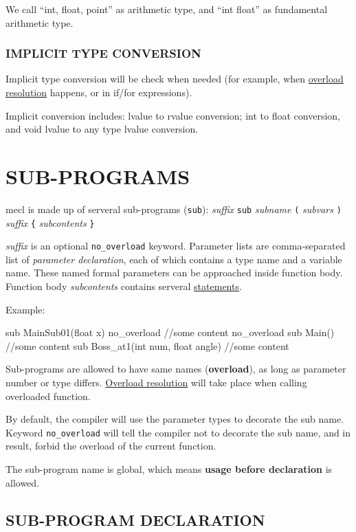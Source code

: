 \documentclass{article}
\begin{document}
We call ``int, float, point'' as arithmetic type, and ``int float'' as fundamental arithmetic type.

\subsubsection{IMPLICIT TYPE CONVERSION}

Implicit type conversion will be check when needed (for example, when \hyperref[chongzai]{overload resolution} happens, or in if/for expressions).

Implicit conversion includes: lvalue to rvalue conversion; int to float conversion, and void lvalue to any type lvalue conversion.

\section{SUB-PROGRAMS}

mecl is made up of serveral sub-programs (\verb|sub|): \textit{suffix} \verb|sub| \textit{subname} \verb|(| \textit{subvars} \verb|)| \textit{suffix} \verb|{| \textit{subcontents} \verb|}|

\textit{suffix} is an optional \verb|no_overload| keyword. Parameter lists are comma-separated list of \textit{parameter declaration}, each of which contains a type name and a variable name. These named formal parameters can be approached inside function body. Function body \textit{subcontents} contains serveral \hyperref[yuju]{statements}.

Example:

\begin{MUAvbt}
sub MainSub01(float x) no_overload
{
	//some content
}
no_overload sub Main()
{
	//some content
}
sub Boss_at1(int num, float angle) {
	//some content
}
\end{MUAvbt}

Sub-programs are allowed to have same names (\textbf{overload}), as long as parameter number or type differs. \hyperref[chongzai]{Overload resolution} will take place when calling overloaded function.

By default, the compiler will use the parameter types to decorate the sub name. Keyword \verb|no_overload| will tell the compiler not to decorate the sub name, and in result, forbid the overload of the current function.

The sub-program name is global, which means \textbf{usage before declaration} is allowed.

\subsection{SUB-PROGRAM DECLARATION}
\end{document}
